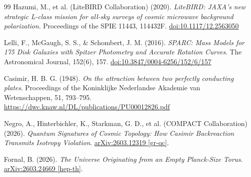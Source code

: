 \documentclass[aps,prd,11pt,onecolumn,superscriptaddress,nofootinbib,floatfix]{revtex4-2}
\begin{document}
\begin{thebibliography}{99}
Hazumi, M., et al. (LiteBIRD Collaboration) (2020). \textit{LiteBIRD: JAXA's new strategic L-class mission for all-sky surveys of cosmic microwave background polarization}. Proceedings of the SPIE 11443, 114432F. \href{https://doi.org/10.1117/12.2563050}{doi:10.1117/12.2563050}

Lelli, F., McGaugh, S. S., \& Schombert, J. M. (2016). \textit{SPARC: Mass Models for 175 Disk Galaxies with Spitzer Photometry and Accurate Rotation Curves}. The Astronomical Journal, 152(6), 157. \href{https://doi.org/10.3847/0004-6256/152/6/157}{doi:10.3847/0004-6256/152/6/157}

Casimir, H. B. G. (1948). \textit{On the attraction between two perfectly conducting plates}. Proceedings of the Koninklijke Nederlandse Akademie van Wetenschappen, 51, 793--795. \url{https://dwc.knaw.nl/DL/publications/PU00012826.pdf}

Negro, A., Hinterbichler, K., Starkman, G. D., et al. (COMPACT Collaboration) (2026). \textit{Quantum Signatures of Cosmic Topology: How Casimir Backreaction Transmits Isotropy Violation}. \href{https://arxiv.org/abs/2603.12319}{arXiv:2603.12319 [gr-qc]}.

Fornal, B. (2026). \textit{The Universe Originating from an Empty Planck-Size Torus}. \href{https://arxiv.org/abs/2603.24669}{arXiv:2603.24669 [hep-th]}.

\end{thebibliography}
\end{document}

